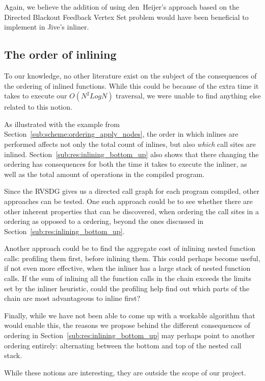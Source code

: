 Again, we believe the addition of using den~Heijer's approach based on the
Directed Blackout Feedback Vertex Set problem would have been beneficial to
implement in Jive's inliner.

\subsection{The order of inlining}
\label{sub:fw:call_site_visit_order}

To our knowledge, no other literature exist on the subject of the consequences
of the ordering of inlined functions. While this could be because of the extra
time it takes to execute our $O(N^2 Log N)$ traversal, we were unable to find
anything else related to this notion.

As illustrated with the example from
Section~\ref{sub:scheme:ordering_apply_nodes}, the order in which inlines are
performed affects not only the total count of inlines, but also \textit{which}
call sites are inlined. Section~\ref{sub:res:inlining_bottom_up} also shows that
there changing the ordering has consequences for both the time it takes to
execute the inliner, as well as the total amount of operations in the compiled
program.

Since the RVSDG gives us a directed call graph for each program compiled, other
approaches can be tested. One such approach could be to see whether there are
other inherent properties that can be discovered, when ordering the call sites
in a  ordering as opposed to a 
ordering, beyond the ones discussed in Section~\ref{sub:res:inlining_bottom_up}.

Another approach could be to find the aggregate cost of inlining nested function
calls: profiling them first, before inlining them. This could perhaps become
useful, if not even more effective, when the inliner has a large stack of nested
function calls. If the sum of inlining all the function calls in the chain
exceeds the limits set by the inliner heuristic, could the profiling help find
out which parts of the chain are most advantageous to inline first?

Finally, while we have not been able to come up with a workable algorithm that
would enable this, the reasons we propose behind the different consequences of
ordering in Section~\ref{sub:res:inlining_bottom_up} may perhaps point to
another ordering entirely: alternating between the bottom and top of the nested
call stack.

While these notions are interesting, they are outside the scope of our project.
